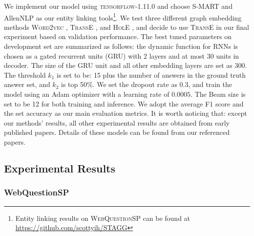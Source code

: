 We implement our model using \textsc{tensorflow-1.11.0} and choose S-MART \cite{DBLP:journals/corr/YangC16a} and AllenNLP \cite{Gardner2017AllenNLP} as our entity linking tools\footnote{Entity linking results on \textsc{WebQuestionSP} can be found at \url{https://github.com/scottyih/STAGG}}. We test three different graph embedding methods \textsc{Word2vec} \cite{DBLP:journals/corr/abs-1301-3781}, \textsc{TransE} \cite{DBLP:conf/nips/BordesUGWY13}, and \textsc{HolE} \cite{DBLP:journals/corr/TrouillonN17}, and decide to use \textsc{TransE} in our final experiment based on validation performance. The best tuned parameters on development set are summarized as follows: the dynamic function for RNNs is chosen as a gated recurrent units (GRU) with 2 layers and at most 30 units in decoder. The size of the GRU unit and all other embedding layers are set as 300. The threshold $k_1$ is set to be: 15 plus the number of answers in the ground truth answer set, and $k_2$ is top 50\%. We set the dropout rate as 0.3, and train the model using an Adam optimizer with a learning rate of $0.0005$. The Beam size is set to be 12 for both training and inference. We adopt the average F1 score and the set accuracy as our main evaluation metrics. %
It is worth noticing that: except our methods' results, all other experimental results are obtained from early published papers. Details of these models can be found from our referenced papers.



\subsection{Experimental Results}

\subsubsection{WebQuestionSP}

